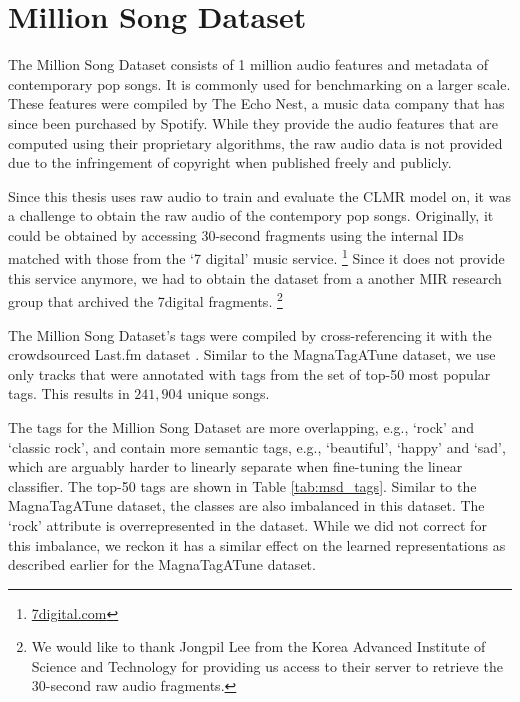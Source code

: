 \section{Million Song Dataset}
The Million Song Dataset consists of 1 million audio features and metadata of contemporary pop songs.
It is commonly used for benchmarking on a larger scale.
These features were compiled by The Echo Nest, a music data company that has since been purchased by Spotify.
While they provide the audio features that are computed using their proprietary algorithms, the raw audio data is not provided due to the infringement of copyright when published freely and publicly.

Since this thesis uses raw audio to train and evaluate the CLMR model on, it was a challenge to obtain the raw audio of the contempory pop songs.
Originally, it could be obtained by accessing 30-second fragments using the internal IDs matched with those from the `7 digital' music service.
\footnote{\url{7digital.com}}
Since it does not provide this service anymore, we had to obtain the dataset from a another MIR research group that archived the 7digital fragments.
\footnote{We would like to thank Jongpil Lee from the Korea Advanced Institute of Science and Technology for providing us access to their server to retrieve the 30-second raw audio fragments.}

The Million Song Dataset's tags were compiled by cross-referencing it with the crowdsourced Last.fm dataset \cite{Bertin-Mahieux2011}. Similar to the MagnaTagATune dataset, we use only tracks that were annotated with tags from the set of top-50 most popular tags. This results in $241,904$ unique songs.

The tags for the Million Song Dataset are more overlapping, e.g., `rock' and `classic rock', and contain more semantic tags, e.g., `beautiful', `happy' and `sad', which are arguably harder to linearly separate when fine-tuning the linear classifier.
The top-50 tags are shown in Table \ref{tab:msd_tags}. Similar to the MagnaTagATune dataset, the classes are also imbalanced in this dataset. 
The `rock' attribute is overrepresented in the dataset.
While we did not correct for this imbalance, we reckon it has a similar effect on the learned representations as described earlier for the MagnaTagATune dataset.


